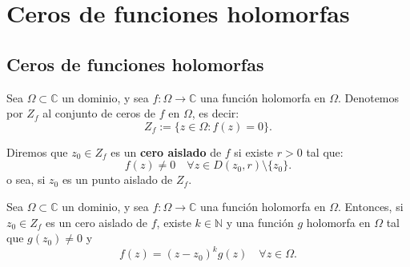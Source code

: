 \section{Ceros de funciones holomorfas}
\subsection{Ceros de funciones holomorfas}

\begin{definición} 
    Sea $\Omega \subset \mathbb{C}$ un dominio, y sea $f : \Omega \to \mathbb{C}$ una función holomorfa en $\Omega$. Denotemos por $Z_f$ al conjunto de ceros de $f$ en $\Omega$, es decir:
    \[
        Z_f := \{ z \in \Omega : f(z) = 0 \}.
    \]
\end{definición}

\begin{definición} 
    Diremos que $z_0 \in Z_f$ es un \textbf{cero aislado} de $f$ si existe $r > 0$ tal que:
    \[
        f(z) \neq 0 \quad \forall z \in D(z_0, r) \setminus \{ z_0 \}.
    \]
    o sea, si $z_0$ es un punto aislado de $Z_f$.
\end{definición}

\begin{proposición}
    Sea $\Omega \subset \mathbb{C}$ un dominio, y sea $f : \Omega \to \mathbb{C}$ una función holomorfa en $\Omega$. Entonces, si $z_0 \in Z_f$ es un cero aislado de $f$, existe $k \in \mathbb{N}$ y una función $g$ holomorfa en $\Omega$ tal que $g(z_0) \neq 0$ y \label{prop:ceros_aislados}
    \[
        f(z) = (z - z_0)^k g(z) \quad \forall z \in \Omega.
    \]
\end{proposición}

